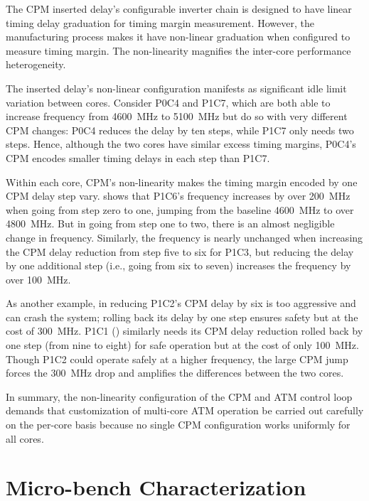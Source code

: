 The CPM inserted delay's configurable inverter chain is designed to have linear timing delay graduation for timing margin measurement. However, the manufacturing process makes it have non-linear graduation when configured to measure timing margin. The non-linearity magnifies the inter-core performance heterogeneity.

The inserted delay's non-linear configuration manifests as significant idle limit variation between cores. Consider P0C4 and P1C7, which are both able to increase frequency from 4600~MHz to 5100~MHz but do so with very different CPM changes: P0C4 reduces the delay by ten steps, while P1C7 only needs two steps. Hence, although the two cores have similar excess timing margins, P0C4's CPM encodes smaller timing delays in each step than P1C7. 

Within each core, CPM's non-linearity makes the timing margin encoded by one CPM delay step vary.  shows that P1C6's frequency increases by over 200~MHz when going from step zero to one, jumping from the baseline 4600~MHz to over 4800~MHz. But in going from step one to two, there is an almost negligible change in frequency. Similarly, the frequency is nearly unchanged when increasing the CPM delay reduction from step five to six for P1C3, but reducing the delay by one additional step (i.e., going from six to seven) increases the frequency by over 100~MHz.

As another example, in  reducing P1C2's CPM delay by six is too aggressive and can crash the system; rolling back its delay by one step ensures safety but at the cost of 300~MHz. P1C1 () similarly needs its CPM delay reduction rolled back by one step (from nine to eight) for safe operation but at the cost of only 100~MHz. Though P1C2 could operate safely at a higher frequency, the large CPM jump forces the 300~MHz drop and amplifies the differences between the two cores.

In summary, the non-linearity configuration of the CPM and ATM control loop demands that customization of multi-core ATM operation be carried out carefully on the per-core basis because no single CPM configuration works uniformly for all cores.

\section{Micro-bench Characterization}
\label{sec:process:ubench}



